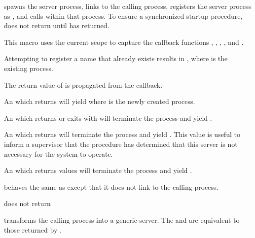  spawns the server process, links to
the calling process, registers the server process as , and calls
 within that process. To ensure a
synchronized startup procedure,  does
not return until  has returned.

This macro uses the current scope to capture the callback functions
, , ,
, and .

Attempting to register a name that already exists results in
, where
 is the existing process.

The return value of  is propagated from
the  callback.

An  which returns  will yield  where
 is the newly created process.

An  which returns  or exits
with  will terminate the process and yield
.

An  which returns  will terminate the
process and yield . This value is useful to inform a
supervisor that the  procedure has determined that this
server is not necessary for the system to operate.

An  which returns  values will terminate the
process and yield .

\begin{syntax}
\end{syntax}
\returns{}

 behaves the same as 
except that it does not link to the calling process.

\begin{syntax}
\end{syntax}
\returns{} does not return

 transforms the calling process into a
generic server. The  and  are equivalent to
those returned by .

